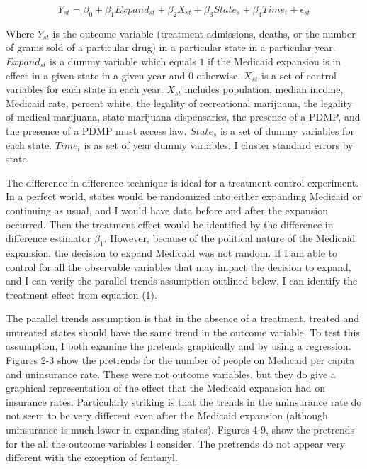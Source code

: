 \documentclass{article}
\begin{document}
\begin{equation}
    Y_{st}=\beta_0+\beta_1 Expand_{st}+\beta_2 X_{st} + \beta_3 State_s + \beta_4 Time_t + \epsilon_{st}
\end{equation}

Where $Y_{st}$ is the outcome variable (treatment admissions, deaths, or the number of grams sold of a particular drug) in a particular state in a particular year.  $Expand_{st}$  is a dummy variable which equals $1$ if the Medicaid expansion is in effect in a given state in a given year and $0$ otherwise.
$X_{st}$  is a set of control variables for each state in each year. $X_{st}$  includes population, median income, Medicaid rate, percent white, the legality of recreational marijuana, the legality of medical marijuana, state marijuana dispensaries, the presence of a PDMP, and the presence of a PDMP must access law.  $State_s$ is a set of dummy variables for each state. 
 $Time_t$ is as set of year dummy variables.  I cluster standard errors by state.

The difference in difference technique is ideal for a treatment-control experiment.  In a perfect world, states would be randomized into either expanding Medicaid or continuing as usual, and I would have data before and after the expansion occurred.  Then the treatment effect would be identified by the difference in difference estimator $\beta_1$. However, because of the political nature of the Medicaid expansion, the decision to expand Medicaid was not random.  If I am able to control for all the observable variables that may impact the decision to expand, and I can verify the parallel trends assumption outlined below, I can identify the treatment effect from equation (1).  

The parallel trends assumption is that in the absence of a treatment, treated and untreated states should have the same trend in the outcome variable.  To test this assumption, I both examine the pretends graphically and by using a regression. Figures 2-3 show the pretrends for the number of people on Medicaid per capita and uninsurance rate.  These were not outcome variables, but they do give a graphical representation of the effect that the Medicaid expansion had on insurance rates.  Particularly striking is that the trends in the uninsurance rate do not seem to be very different even after the Medicaid expansion (although uninsurance is much lower in expanding states).  Figures 4-9, show the pretrends for the all the outcome variables I consider.  The pretrends do not appear very different with the exception of fentanyl.
\end{document}
